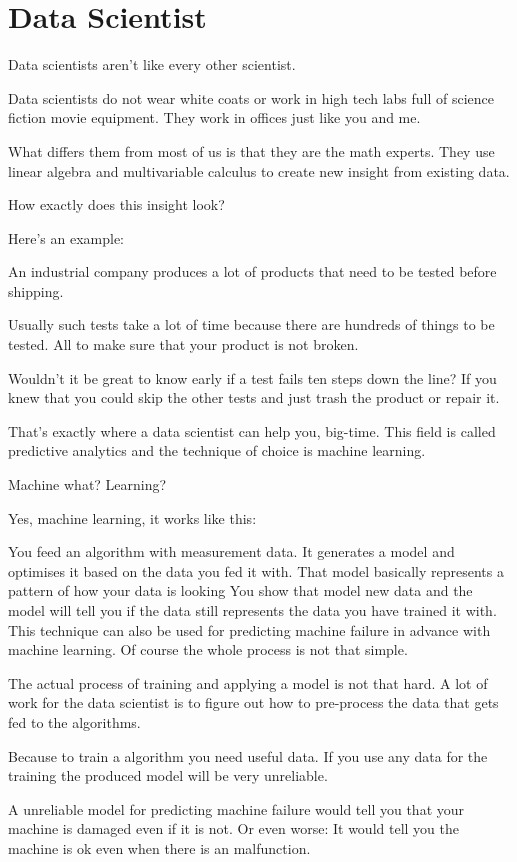 \documentclass[12pt, numbers=noenddot]{scrreprt} %
\begin{document}
\section{Data Scientist}
Data scientists aren’t like every other scientist.

Data scientists do not wear white coats or work in high tech labs full of science fiction movie equipment. They work in offices just like you and me.

What differs them from most of us is that they are the math experts. They use linear algebra and multivariable calculus to create new insight from existing data.

How exactly does this insight look?

Here’s an example:

An industrial company produces a lot of products that need to be tested before shipping.

Usually such tests take a lot of time because there are hundreds of things to be tested. All to make sure that your product is not broken.

Wouldn’t it be great to know early if a test fails ten steps down the line? If you knew that you could skip the other tests and just trash the product or repair it.

That’s exactly where a data scientist can help you, big-time. This field is called predictive analytics and the technique of choice is machine learning.

Machine what? Learning?

Yes, machine learning, it works like this:

You feed an algorithm with measurement data.
It generates a model and optimises it based on the data you fed it with. That model basically represents a pattern of how your data is looking
You show that model new data and the model will tell you if the data still represents the data you have trained it with.
This technique can also be used for predicting machine failure in advance with machine learning. Of course the whole process is not that simple.

The actual process of training and applying a model is not that hard. A lot of work for the data scientist is to figure out how to pre-process the data that gets fed to the algorithms.

Because to train a algorithm you need useful data. If you use any data for the training the produced model will be very unreliable.

A unreliable model for predicting machine failure would tell you that your machine is damaged even if it is not. Or even worse: It would tell you the machine is ok even when there is an malfunction.
\end{document}
